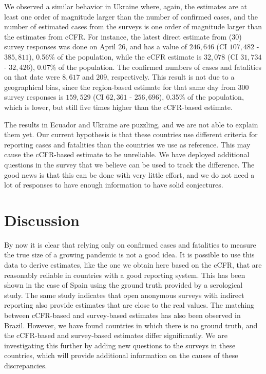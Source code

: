 \documentclass[sigconf,authordraft]{acmart}
\begin{document}
We observed a similar behavior in Ukraine where, again, the estimates are at least one order of magnitude larger than the number of confirmed cases, and the number of estimated cases from the surveys is one order of magnitude larger than the estimates from cCFR. For instance,
the latest direct estimate from (30) survey responses was done on April 26, and has a value of $246,646$ (CI $107,482$ - $385,811$), 0.56\% of the population, while the cCFR estimate is $32,078$ (CI $31,734$ - $32,426$), 0.07\% of the population. The confirmed numbers of cases and fatalities on that date were $8,617$ and $209$, respectively. This result is not due to a geographical bias, since the region-based estimate for that same day from 300 survey responses is $159,529$ (CI $62,361$ - $256,696$), 0.35\% of the population, which is lower, but still five times higher than the cCFR-based estimate.

The results in Ecuador and Ukraine are puzzling, and we are not able to explain them yet. Our current hypothesis is that these countries use different criteria for reporting cases and fatalities than the countries we use as reference. This may cause the cCFR-based estimate to be unreliable. We have deployed additional questions in the survey that we believe can be used to track the difference. The good news is that this can be done with very little effort, and we do not need a lot of responses to have enough information to have solid conjectures.

\section{Discussion}

By now it is clear that relying only on confirmed cases and fatalities to measure the true size of a growing pandemic is not a good idea. It is possible to use this data to derive estimates, like the one we obtain here based on the cCFR, that are
reasonably reliable in countries with a good reporting system. This has been shown in the case of Spain using the ground
truth provided by a serological study. The same study indicates that open anonymous surveys with indirect reporting also provide estimates that are close to the real values. The matching between cCFR-based and survey-based estimates has also been observed in Brazil. However, we have found countries in which there is no ground truth, and the cCFR-based and survey-based estimates differ significantly. We are investigating this further by adding new questions to the surveys in these countries,
which will provide additional information on the causes of these discrepancies.
\end{document}
